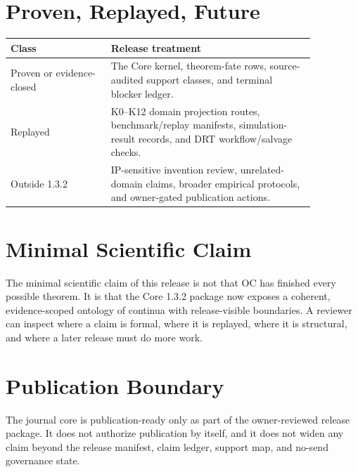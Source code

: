\documentclass[11pt,a4paper]{article}
\begin{document}
\section*{Proven, Replayed, Future}
\begin{longtable}{>{\raggedright\arraybackslash}p{0.28\linewidth}>{\raggedright\arraybackslash}p{0.58\linewidth}}
\textbf{Class} & \textbf{Release treatment}\\
\hline
Proven or evidence-closed & The Core kernel, theorem-fate rows, source-audited support classes, and terminal blocker ledger.\\
Replayed & K0--K12 domain projection routes, benchmark/replay manifests, simulation-result records, and DRT workflow/salvage checks.\\
Outside 1.3.2 & IP-sensitive invention review, unrelated-domain claims, broader empirical protocols, and owner-gated publication actions.\\
\end{longtable}

\section*{Minimal Scientific Claim}
The minimal scientific claim of this release is not that OC has finished every possible theorem. It is that the Core 1.3.2 package now exposes a coherent, evidence-scoped ontology of continua with release-visible boundaries. A reviewer can inspect where a claim is formal, where it is replayed, where it is structural, and where a later release must do more work.

\section*{Publication Boundary}
The journal core is publication-ready only as part of the owner-reviewed release package. It does not authorize publication by itself, and it does not widen any claim beyond the release manifest, claim ledger, support map, and no-send governance state.

\clearpage
\end{document}

